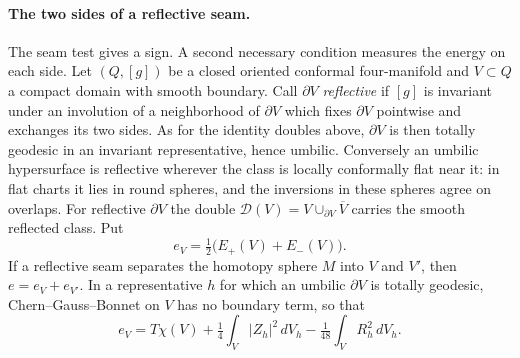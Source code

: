 
\paragraph{The two sides of a reflective seam.}
The seam test gives a sign. A second necessary condition measures the
energy on each side. Let \((Q,[g])\) be a closed oriented conformal
four-manifold and \(V\subset Q\) a compact domain with smooth boundary.
Call \(\partial V\) \emph{reflective} if \([g]\) is invariant under an
involution of a neighborhood of \(\partial V\) which fixes \(\partial V\)
pointwise and exchanges its two sides. As for the identity doubles
above, \(\partial V\) is then totally geodesic in an invariant
representative, hence umbilic. Conversely an umbilic hypersurface is
reflective wherever the class is locally conformally flat near it: in
flat charts it lies in round spheres, and the inversions in these
spheres agree on overlaps. For reflective \(\partial V\) the double
\(\mathcal D(V)=V\cup_{\partial V}\overline V\) carries the smooth
reflected class. Put
\[
 e_V=\tfrac12\big(E_+(V)+E_-(V)\big).
\]
If a reflective seam separates the homotopy sphere \(M\) into \(V\) and
\(V'\), then \(e=e_V+e_{V'}\). In a representative \(h\) for which an
umbilic \(\partial V\) is totally geodesic, Chern--Gauss--Bonnet on
\(V\) has no boundary term, so that
\[
 e_V=T\chi(V)+\tfrac14\int_V|Z_h|^2\,dV_h-\tfrac1{48}\int_VR_h^2\,dV_h .
\]

